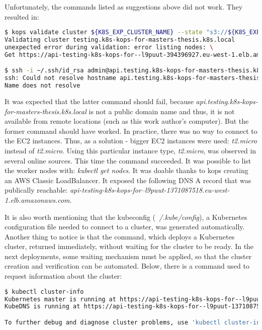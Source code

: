 Unfortunately, the commands listed as suggestions above did not work. They resulted in:
\begin{lstlisting}[basicstyle=\tiny,caption={Commands run in attempt to connect with a cluster created by Kops together with returned output},captionpos=b,language=Bash,xleftmargin=1cm]
$ kops validate cluster ${K8S_EXP_CLUSTER_NAME} --state "s3://${K8S_EXP_KOPS_S3_BUCKET}"
Validating cluster testing.k8s-kops-for-masters-thesis.k8s.local
unexpected error during validation: error listing nodes: \
Get https://api-testing-k8s-kops-for--l9puut-394396927.eu-west-1.elb.amazonaws.com/api/v1/nodes: EOF

$ ssh -i ~/.ssh/id_rsa admin@api.testing.k8s-kops-for-masters-thesis.k8s.local
ssh: Could not resolve hostname api.testing.k8s-kops-for-masters-thesis.k8s.local: \
Name does not resolve
\end{lstlisting}

It was expected that the latter command should fail, because \textit{api.testing.k8s-kops-for-masters-thesis.k8s.local} is not a public domain name and thus, it is not available from remote locations (such as this work author's computer). But the former command should have worked. In practice, there was no way to connect to the EC2 instances. Thus, as a solution - bigger EC2 instances were used: \textit{t2.micro} instead of \textit{t2.micro}. Using this particular instance type, \textit{t2.micro}, was observed in several online sources\cite{online-ha-k8s-blog}\cite{online-perfect-k8s-blog}\cite{online-kops-sa}. This time the command succeeded. It was possible to list the worker nodes with: \textit{kubectl get nodes}. It was doable thanks to kops creating an AWS Classic LoadBalancer. It exposed the following DNS A record that was publically reachable: \textit{api-testing-k8s-kops-for--l9puut-1371087518.eu-west-1.elb.amazonaws.com}.

It is also worth mentioning that the kubeconfig (\textit{~/.kube/config}), a Kubernetes configuration file needed to connect to a cluster, was generated automatically. Another thing to notice is that the command, which deploys a Kubernetes cluster, returned immediately, without waiting for the cluster to be ready. In the next deployments, some waiting mechanism must be applied, so that the cluster creation and verification can be automated. Below, there is a command used to request information about the cluster:
\begin{lstlisting}[basicstyle=\tiny,caption={Command used to request information about a running Kubernetes cluster},captionpos=b,language=Bash,xleftmargin=1cm]
$ kubectl cluster-info
Kubernetes master is running at https://api-testing-k8s-kops-for--l9puut-1371087518.eu-west-1.elb.amazonaws.com
KubeDNS is running at https://api-testing-k8s-kops-for--l9puut-1371087518.eu-west-1.elb.amazonaws.com/api/v1/namespaces/kube-system/services/kube-dns:dns/proxy

To further debug and diagnose cluster problems, use 'kubectl cluster-info dump'.
\end{lstlisting}


